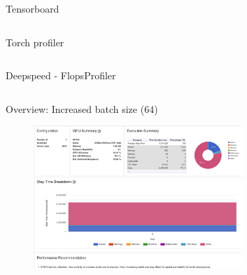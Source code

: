 \documentclass[compress,aspectratio=169]{beamer}
\begin{document}
\begin{frame}[fragile]{Tensorboard}
        \footnotesize\inputminted[xleftmargin=1em,linenos,fontsize=\scriptsize, highlightlines={1,3,9-12,14-16}]{python}{../../data/tensorboard.py}
\end{frame}

\begin{frame}[fragile]{Torch profiler}
        \footnotesize\inputminted[xleftmargin=1em,linenos,fontsize=\scriptsize, highlightlines={4-10,14,15}]{python}{../../data/profiler-torch.py}
\end{frame}

\begin{frame}[fragile]{Deepspeed - FlopsProfiler}
        \footnotesize\inputminted[xleftmargin=1em,linenos,fontsize=\scriptsize, highlightlines={1,3,4,8,9,11-18}]{python}{../../data/deepspeed.py}
\end{frame}

\begin{frame}{Overview: Increased batch size (64)}
    \vspace{-1em}
\begin{center}
    \begin{figure}
        \includegraphics[width=0.7\textwidth]{../../data/scap_gtx1080_profiler-torch_batch-size-64_14650758}
    \end{figure}
    \end{center}

\end{frame}
\end{document}
